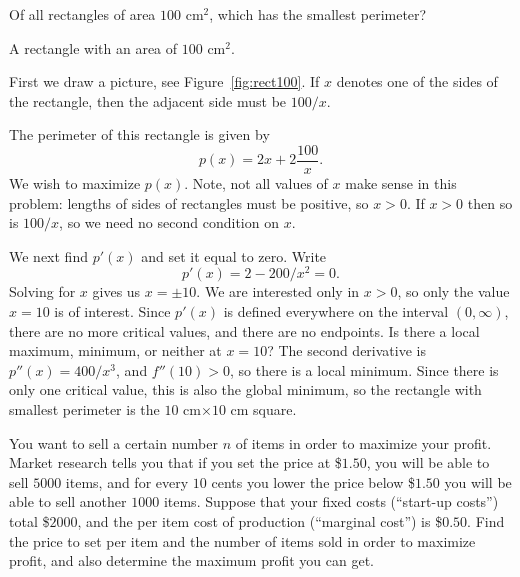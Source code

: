 \begin{example}
Of all rectangles of area $100$ cm$^2$, which has the smallest
perimeter?
\end{example}

\begin{marginfigure}
\caption{A rectangle with an area of $100$ cm$^2$.}
\label{fig:rect100}
\end{marginfigure}

\begin{solution}
First we draw a picture, see Figure~\ref{fig:rect100}.  If $x$ denotes
one of the sides of the rectangle, then the adjacent side must be
$100/x$.


The perimeter of this rectangle is given by
\[
p(x)=2x+2\frac{100}{x}.
\]
We wish to maximize $p(x)$.  Note, not all values of $x$ make sense in this
problem: lengths of sides of rectangles must be positive, so $x>0$. If
$x>0$ then so is $100/x$, so we need no second condition on $x$.

We next find $p'(x)$ and set it equal to zero. Write
\[
p'(x)=2-200/x^2 = 0.
\]
Solving for $x$ gives us $x=\pm 10$. We are interested only in $x>0$,
so only the value $x=10$ is of interest. Since $p'(x)$ is defined
everywhere on the interval $(0,\infty)$, there are no more critical
values, and there are no endpoints. Is there a local maximum, minimum,
or neither at $x=10$? The second derivative is $p''(x)=400/x^3$, and
$f''(10)>0$, so there is a local minimum. Since there is only one
critical value, this is also the global minimum, so the rectangle with
smallest perimeter is the $10$ cm$\times10$ cm square.
\end{solution}

\begin{example}
You want to sell a certain number $n$ of items in order to maximize your
profit.  Market research tells you that if you set the price at \$$1.50$, you
will be able to sell $5000$ items, and for every $10$ cents you lower the price
below \$$1.50$ you will be able to sell another $1000$ items.  Suppose that
your fixed costs (``start-up costs'') total \$$2000$, and the per item cost
of production (``marginal cost'') is \$$0.50$.  Find the price to set per
item and the number of items sold in order to maximize profit, and also
determine the maximum profit you can get.
\end{example}

